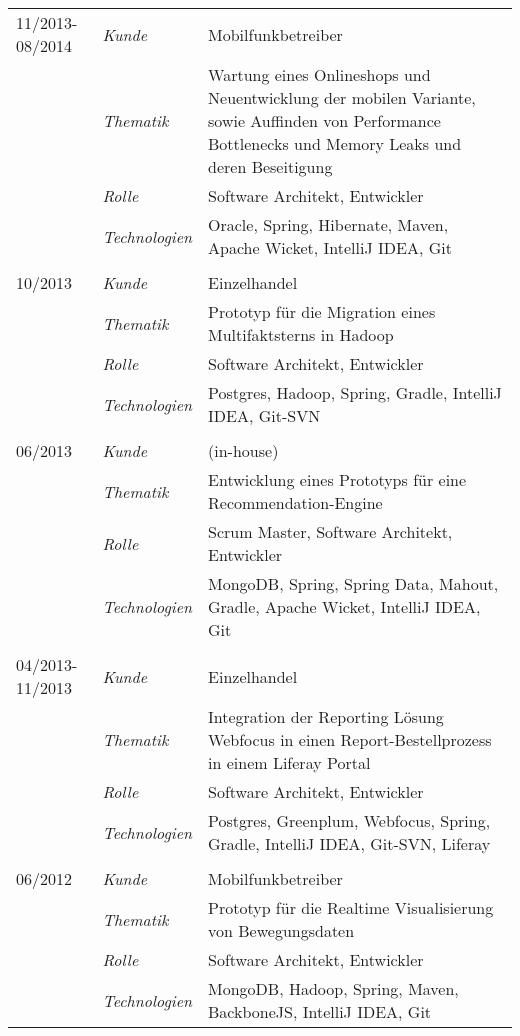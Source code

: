 \begin{longtable}{@{}>{}p{4cm}>{\itshape}p{2cm}>{}p{9cm}}
\\
11/2013-08/2014     & Kunde 	    & Mobilfunkbetreiber\\
\nopagebreak		& Thematik	    & Wartung eines Onlineshops und Neuentwicklung der mobilen Variante, sowie Auffinden von Performance Bottlenecks und Memory Leaks und deren Beseitigung\\
\nopagebreak		& Rolle 	    & Software Architekt, Entwickler\\
\nopagebreak		& Technologien	& Oracle, Spring, Hibernate, Maven, Apache Wicket, IntelliJ IDEA, Git\\
\\
10/2013             & Kunde 	    & Einzelhandel\\
\nopagebreak		& Thematik	    & Prototyp für die Migration eines Multifaktsterns in Hadoop\\
\nopagebreak		& Rolle 	    & Software Architekt, Entwickler\\
\nopagebreak		& Technologien	& Postgres, Hadoop, Spring, Gradle, IntelliJ IDEA, Git-SVN\\
\\
06/2013             & Kunde 	    & (in-house)\\
\nopagebreak		& Thematik	    & Entwicklung eines Prototyps für eine Recommendation-Engine\\
\nopagebreak		& Rolle 	    & Scrum Master, Software Architekt, Entwickler\\
\nopagebreak		& Technologien	& MongoDB, Spring, Spring Data, Mahout, Gradle, Apache Wicket, IntelliJ IDEA, Git\\
\\
04/2013-11/2013     & Kunde 	    & Einzelhandel\\
\nopagebreak		& Thematik	    & Integration der Reporting Lösung Webfocus in einen Report-Bestellprozess in einem Liferay Portal\\
\nopagebreak		& Rolle 	    & Software Architekt, Entwickler\\
\nopagebreak		& Technologien	& Postgres, Greenplum, Webfocus, Spring, Gradle, IntelliJ IDEA, Git-SVN, Liferay\\
\\
06/2012             & Kunde 	    & Mobilfunkbetreiber\\
\nopagebreak		& Thematik	    & Prototyp für die Realtime Visualisierung von Bewegungsdaten \\
\nopagebreak		& Rolle 	    & Software Architekt, Entwickler\\
\nopagebreak		& Technologien	& MongoDB, Hadoop, Spring, Maven, BackboneJS, IntelliJ IDEA, Git\\

\end{longtable}

